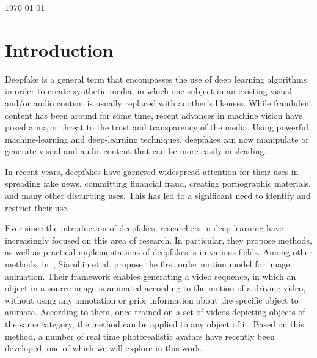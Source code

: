 \documentclass[english,12pt]{article}
\begin{document}
\begin{titlepage}


{\large \today}\\[3cm] 


\vfill %

\end{titlepage}

\pagebreak{}


\tableofcontents{}

\pagebreak{}


\section{Introduction} \label{introduction}

Deepfake is a general term that encompasses the use of deep learning algorithms in order to create
synthetic media, in which one subject in an existing visual and/or audio content is usually replaced
with another's likeness. While fraudulent content has been around for some time, recent advances in
machine vision have posed a major threat to the trust and transparency of the media. Using powerful
machine-learning and deep-learning techniques, deepfakes can now manipulate or generate visual and
audio content that can be more easily misleading.

In recent years, deepfakes have garnered widespread attention for their uses in spreading fake news,
committing financial fraud, creating pornographic materials, and many other disturbing uses. This has
led to a significant need to identify and restrict their use.

Ever since the introduction of deepfakes, researchers in deep learning have increasingly focused on
this area of research. In particular, they propose methods, as well as practical implementations of
deepfakes is in various fields. Among other methods, in~\cite{DBLP:journals/corr/abs-2003-00196}, Siarohin et al. propose
the first order motion model for image animation. Their framework enables generating a video sequence,
in which an object in a source image is animated according to the motion of a driving video, without
using any annotation or prior information about the specific object to animate. According to them,
once trained on a set of videos depicting objects of the same category, the method can be applied
to any object of it. Based on this method, a number of real time photorealistic avatars have recently
been developed, one of which we will explore in this work.
\end{document}
